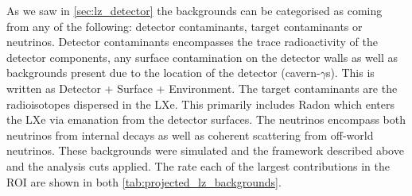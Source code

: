 \par
As we saw in \autoref{sec:lz_detector} the backgrounds can be categorised as coming from any of the following: detector contaminants, target contaminants or neutrinos.
Detector contaminants encompasses the trace radioactivity of the detector components, any surface contamination on the detector walls as well as backgrounds present due to the location of the detector (cavern-$\gamma$s).
This is written as Detector + Surface + Environment.
The target contaminants are the radioisotopes dispersed in the LXe. 
This primarily includes Radon which enters the LXe via emanation from the detector surfaces. 
The neutrinos encompass both neutrinos from internal decays as well as coherent scattering from off-world neutrinos.
These backgrounds were simulated and the framework described above and the analysis cuts applied.
The rate each of the largest contributions in the ROI are shown in both \autoref{tab:projected_lz_backgrounds}.
